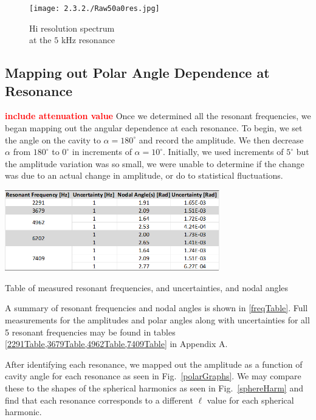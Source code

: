 \documentclass[12pt]{article}
\renewcommand{\deg}{^\circ} %
\newcommand{\red}[1]{\textbf{\textcolor{red}{#1}}} %
\newcommand{\figref}[1]{Fig.\ \ref{#1}}
\begin{document}
		\begin{figure}[H]
			\texttt{[image: 2.3.2./Raw50a0res.jpg]}
			\caption{Hi resolution spectrum\\ at the $5$ kHz resonance}
			\label{hiRes5K}
		\end{figure}
		
		
		\subsection{Mapping out Polar Angle Dependence at Resonance}
		\red{include attenuation value}
		Once we determined all the resonant frequencies, we began mapping out the angular dependence at each resonance. To begin, we set the angle on the cavity to $\alpha = 180 \deg$ and record the amplitude. We then decrease $\alpha$ from $180 \deg$ to $0 \deg$ in increments of $\alpha = 10\deg$. Initially, we used increments of $5\deg$ but the amplitude variation was so small, we were unable to determine if the change was due to an actual change in amplitude, or do to statistical fluctuations. 
		
		
		\begin{table}[H]
			\captionsetup{justification = centering}
			\centering
			\includegraphics[width=0.7\textwidth]{Tables/ResTable.png}
			\caption{Table of measured resonant frequencies, and uncertainties, and nodal angles}
			\label{freqTable}
		\end{table}			
		
		A summary of resonant frequencies and nodal angles is shown in \cref{freqTable}. Full measurements for the amplitudes and polar angles along with uncertainties for all 5 resonant frequencies may be found in tables \cref{2291Table,3679Table,4962Table,7409Table} in Appendix A.
		
		After identifying each resonance, we mapped out the amplitude as a function of cavity angle for each resonance as seen in \figref{polarGraphs}. We may compare these to the shapes of the spherical harmonics as seen in \figref{sphereHarm} and find that each resonance corresponds to a different $\ell$ value for each spherical harmonic.
		
\end{document}
